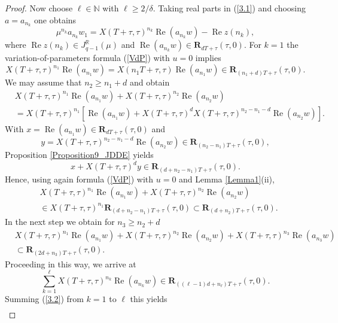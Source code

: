 \documentclass{siamltex}%
\begin{document}
\begin{proof}
Now choose $\ell\in\mathbb{N}$ with $\ell\geq2/\delta$. Taking real parts in
(\ref{3.1}) and choosing $a=a_{n_{k}}$ one obtains%
\begin{equation}
\mu^{n_{k}}a_{n_{k}}w_{1}=X(T+\tau,\tau)^{n_{k}}\operatorname{Re}(a_{n_{k}%
}w)-\operatorname{Re}z(n_{k}), \label{3.2}%
\end{equation}
where $\operatorname{Re}z(n_{k})\in J_{q-1}^{\mathbb{R}}(\mu)$ and
$\operatorname{Re}(a_{n_{k}}w)\in\mathbf{R}_{dT+\tau}(\tau,0)$. For $k=1$ the
variation-of-parameters formula (\ref{VdP}) with $u=0$ implies%
\[
X(T+\tau,\tau)^{n_{1}}\operatorname{Re}(a_{n_{1}}w)=X(n_{1}T+\tau
,\tau)\operatorname{Re}(a_{n_{1}}w)\in\mathbf{R}_{(n_{1}+d)T+\tau}(\tau,0).
\]
We may assume that $n_{2}\geq n_{1}+d$ and obtain%
\begin{align*}
&  X(T+\tau,\tau)^{n_{1}}\operatorname{Re}(a_{n_{1}}w)+X(T+\tau,\tau)^{n_{2}%
}\operatorname{Re}(a_{n_{2}}w)\\
&  =X(T+\tau,\tau)^{n_{1}}\left[  \operatorname{Re}(a_{n_{1}}w)+X(T+\tau
,\tau)^{d}X(T+\tau,\tau)^{n_{2}-n_{1}-d}\operatorname{Re}(a_{n_{2}}w)\right]
.
\end{align*}
With $x=\operatorname{Re}(a_{n_{1}}w)\in\mathbf{R}_{dT+\tau}(\tau,0)$ and%
\[
y=X(T+\tau,\tau)^{n_{2}-n_{1}-d}\operatorname{Re}(a_{n_{2}}w)\in
\mathbf{R}_{(n_{2}-n_{1})T+\tau}(\tau,0),
\]
Proposition \ref{Proposition9_JDDE} yields%
\[
x+X(T+\tau,\tau)^{d}y\in\mathbf{R}_{(d+n_{2}-n_{1})T+\tau}(\tau,0).
\]
Hence, using again formula (\ref{VdP}) with $u=0$ and Lemma \ref{Lemma1}(ii),%
\begin{align*}
&  X(T+\tau,\tau)^{n_{1}}\operatorname{Re}(a_{n_{1}}w)+X(T+\tau,\tau)^{n_{2}%
}\operatorname{Re}(a_{n_{2}}w)\\
&  \in X(T+\tau,\tau)^{n_{1}}\mathbf{R}_{(d+n_{2}-n_{1})T+\tau}(\tau
,0)\subset\mathbf{R}_{(d+n_{2})T+\tau}(\tau,0).
\end{align*}
In the next step we obtain for $n_{3}\geq n_{2}+d$%
\begin{align*}
&  X(T+\tau,\tau)^{n_{1}}\operatorname{Re}(a_{n_{1}}w)+X(T+\tau,\tau)^{n_{2}%
}\operatorname{Re}(a_{n_{2}}w)+X(T+\tau,\tau)^{n_{3}}\operatorname{Re}%
(a_{n_{3}}w)\\
&  \subset\mathbf{R}_{(2d+n_{3})T+\tau}(\tau,0).
\end{align*}
Proceeding in this way, we arrive at%
\[
\sum_{k=1}^{\ell}X(T+\tau,\tau)^{n_{k}}\operatorname{Re}(a_{n_{k}}%
w)\in\mathbf{R}_{((\ell-1)d+n_{\ell})T+\tau}(\tau,0).
\]
Summing (\ref{3.2}) from $k=1$ to $\ell$ this yields%
\begin{align*}

\end{align*}
\end{proof}
\end{document}
